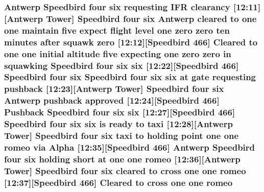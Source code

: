 \subsubsection[{\texorpdfstring{romeo}{romeo}}]{\setlength{\rightskip}{0pt plus 5cm}Antwerp Speedbird four {\bf six} requesting I\+FR clearancy \mbox{[}12\+:11\mbox{]}\mbox{[}Antwerp {\bf Tower}\mbox{]} Speedbird four {\bf six} Antwerp cleared to {\bf one} {\bf one} maintain five expect flight level {\bf one} {\bf zero} {\bf zero} {\bf ten} minutes after squawk {\bf zero} \mbox{[}12\+:12\mbox{]}\mbox{[}Speedbird 466\mbox{]} Cleared to {\bf one} {\bf one} initial altitude five expecting {\bf one} {\bf zero} {\bf zero} in {\bf squawking} Speedbird four {\bf six} {\bf six} \mbox{[}12\+:22\mbox{]}\mbox{[}Speedbird 466\mbox{]} Speedbird four {\bf six} Speedbird four {\bf six} {\bf six} at gate requesting pushback \mbox{[}12\+:23\mbox{]}\mbox{[}Antwerp {\bf Tower}\mbox{]} Speedbird four {\bf six} Antwerp pushback {\bf approved} \mbox{[}12\+:24\mbox{]}\mbox{[}Speedbird 466\mbox{]} Pushback Speedbird four {\bf six} {\bf six} \mbox{[}12\+:27\mbox{]}\mbox{[}Speedbird 466\mbox{]} Speedbird four {\bf six} {\bf six} is ready to taxi \mbox{[}12\+:28\mbox{]}\mbox{[}Antwerp {\bf Tower}\mbox{]} Speedbird four {\bf six} taxi to holding point {\bf one} {\bf one} romeo via {\bf Alpha} \mbox{[}12\+:35\mbox{]}\mbox{[}Speedbird 466\mbox{]} Antwerp Speedbird four {\bf six} holding short at {\bf one} {\bf one} romeo \mbox{[}12\+:36\mbox{]}\mbox{[}Antwerp {\bf Tower}\mbox{]} Speedbird four {\bf six} cleared to cross {\bf one} {\bf one} romeo \mbox{[}12\+:37\mbox{]}\mbox{[}Speedbird 466\mbox{]} Cleared to cross {\bf one} {\bf one} romeo}\hypertarget{happyDay4ATC_8txt_a675cfa5c76a2ab697663f72c9d4e8c9a}{}\label{happyDay4ATC_8txt_a675cfa5c76a2ab697663f72c9d4e8c9a}
